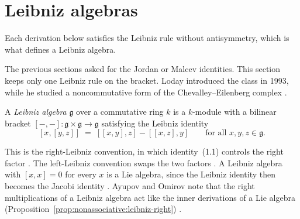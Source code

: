 \section{Leibniz algebras}\label{sec:nonassociative:leibniz}

Each derivation below satisfies the Leibniz rule without antisymmetry, which
is what defines a Leibniz algebra. %

The previous sections asked for the Jordan or Malcev identities.
This section keeps
only one Leibniz rule on the bracket. Loday introduced the class in 1993,
while he studied a noncommutative form of the Chevalley--Eilenberg complex
\cite[Introduction, p.~139]{LodayPirashvili1993}.

\begin{definition}
\label{def:nonassociative:leibniz}
A \emph{Leibniz algebra} $\mathfrak{g}$ over a commutative ring $k$ is a
$k$-module with a bilinear bracket $[-,-]\colon\mathfrak{g}\times
\mathfrak{g}\to\mathfrak{g}$ satisfying the Leibniz identity
\[
[x,[y,z]]\;=\;[[x,y],z]-[[x,z],y]
\qquad\text{for all }x,y,z\in\mathfrak{g}.
\]
\end{definition}

This is the right-Leibniz convention, in which identity~(1.1) controls the
right factor \cite[Definition~(1.1), p.~141]{LodayPirashvili1993}. The left-Leibniz convention swaps the two factors
\cite[Definition~(1.1), p.~141]{LodayPirashvili1993}. A Leibniz algebra with
$[x,x]=0$ for every $x$ is a Lie algebra, since the Leibniz identity then
becomes the Jacobi identity \cite[Definition~(1.1),
p.~141]{LodayPirashvili1993}. Ayupov and Omirov note that the right
multiplications of a Leibniz algebra act like the inner derivations of a Lie
algebra (Proposition~\ref{prop:nonassociative:leibniz-right})
\cite[p.~2]{AyupovOmirov1998Engel}.

